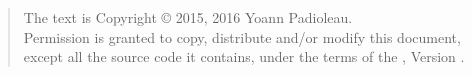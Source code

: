 \begin{quote}
The text is Copyright \copyright{} 2015, 2016 Yoann Padioleau.\\
Permission is granted to copy, distribute and/or modify this document,
except all the source code it contains, under the terms of the 
\license, Version \licenseversion.
\end{quote}
